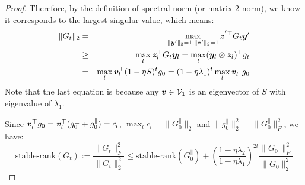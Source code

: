 \begin{proof}
Therefore, by the definition of spectral norm (or matrix 2-norm), we know it corresponds to the largest singular value, which means:
\begin{eqnarray}
    \|G_t\|_2 &=& \max_{\|{\bm{y}}'\|_2=1,\|{\bm{z}}'\|_2=1} {\bm{z}}^{'\top} G_t {\bm{y}}' \\
    &\ge& \max_l {\bm{z}}_l^\top G_t {\bm{y}}_l = \max_l ({\bm{y}}_l\otimes {\bm{z}}_l)^\top g_t \\
    &=& \max_l {\bm{v}}_l^\top (1 - \eta S)^t g_0 = (1 - \eta \lambda_1)^t \max_l {\bm{v}}_l^\top g_0
\end{eqnarray}
Note that the last equation is because any ${\bm{v}}\in \mathcal{V}_1$ is an eigenvector of $S$ with eigenvalue of $\lambda_1$. 

Since ${\bm{v}}_l^\top g_0 = {\bm{v}}_l^\top (g^\perp_0 + g^\parallel_0) = c_l$, $\max_l c_l = \|G^\parallel_0\|_2$ and $\|g^\parallel_0\|_2^2 = \|G^\parallel_0\|_F^2$, we have:
\begin{equation}
    \text{stable-rank}(G_t) := \frac{\|G_t\|_F^2}{\|G_t\|^2_2} \le  \text{stable-rank}(G^\parallel_0) + \left(\frac{1-\eta \lambda_2}{1-\eta \lambda_1}\right)^{2t} \frac{\|G^\perp_0\|_F^2}{\|G_0^\parallel\|_2^2} \label{eq:final-sr-bound}
\end{equation}
\end{proof}


